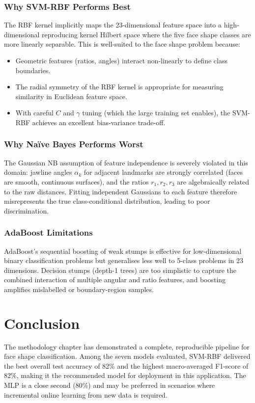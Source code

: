 \subsubsection{Why SVM-RBF Performs Best}
The RBF kernel implicitly maps the 23-dimensional feature space into a high-dimensional reproducing kernel Hilbert space where the five face shape classes are more linearly separable. This is well-suited to the face shape problem because:
\begin{itemize}
    \item Geometric features (ratios, angles) interact non-linearly to define class boundaries.
    \item The radial symmetry of the RBF kernel is appropriate for measuring similarity in Euclidean feature space.
    \item With careful $C$ and $\gamma$ tuning (which the large training set enables), the SVM-RBF achieves an excellent bias-variance trade-off.
\end{itemize}

\subsubsection{Why Naïve Bayes Performs Worst}
The Gaussian NB assumption of feature independence is severely violated in this domain: jawline angles $\alpha_k$ for adjacent landmarks are strongly correlated (faces are smooth, continuous surfaces), and the ratios $r_1, r_2, r_3$ are algebraically related to the raw distances. Fitting independent Gaussians to each feature therefore misrepresents the true class-conditional distribution, leading to poor discrimination.

\subsubsection{AdaBoost Limitations}
AdaBoost's sequential boosting of weak stumps is effective for low-dimensional binary classification problems but generalises less well to 5-class problems in 23 dimensions. Decision stumps (depth-1 trees) are too simplistic to capture the combined interaction of multiple angular and ratio features, and boosting amplifies mislabelled or boundary-region samples.

\section{Conclusion}
\label{sec:meth_conclusion}

The methodology chapter has demonstrated a complete, reproducible pipeline for face shape classification. Among the seven models evaluated, SVM-RBF delivered the best overall test accuracy of 82\% and the highest macro-averaged F1-score of 82\%, making it the recommended model for deployment in this application. The MLP is a close second (80\%) and may be preferred in scenarios where incremental online learning from new data is required.
